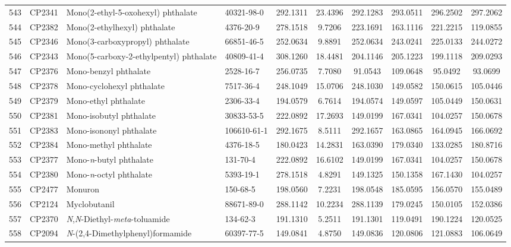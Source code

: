 \begin{longtable}{clllcccccc}
543 & CP2341 & Mono(2-ethyl-5-oxohexyl) phthalate & 40321-98-0 & 292.1311 & 23.4396 & 292.1283 & 293.0511 & 296.2502 & 297.2062 \\ 
544 & CP2382 & Mono(2-ethylhexyl) phthalate\smash{\textsuperscript{\textdaggerdbl}} & 4376-20-9 & 278.1518 & 9.7206 & 223.1691 & 163.1116 & 221.2215 & 119.0855 \\ 
545 & CP2346 & Mono(3-carboxypropyl) phthalate & 66851-46-5 & 252.0634 & 9.8891 & 252.0634 & 243.0241 & 225.0133 & 244.0272 \\ 
546 & CP2343 & Mono(5-carboxy-2-ethylpentyl) phthalate & 40809-41-4 & 308.1260 & 18.4481 & 204.1146 & 205.1223 & 199.1118 & 209.0293 \\ 
547 & CP2376 & Mono-benzyl phthalate & 2528-16-7 & 256.0735 & 7.7080 & 91.0543 & 109.0648 & 95.0492 & 93.0699 \\ 
548 & CP2378 & Mono-cyclohexyl phthalate & 7517-36-4 & 248.1049 & 15.0706 & 248.1030 & 149.0582 & 150.0615 & 105.0446 \\ 
549 & CP2379 & Mono-ethyl phthalate & 2306-33-4 & 194.0579 & 6.7614 & 194.0574 & 149.0597 & 105.0449 & 150.0631 \\ 
550 & CP2381 & Mono-isobutyl phthalate & 30833-53-5 & 222.0892 & 17.2693 & 149.0199 & 167.0341 & 104.0257 & 150.0678 \\ 
551 & CP2383 & Mono-isononyl phthalate & 106610-61-1 & 292.1675 & 8.5111 & 292.1657 & 163.0865 & 164.0945 & 166.0692 \\ 
552 & CP2384 & Mono-methyl phthalate & 4376-18-5 & 180.0423 & 14.2831 & 163.0390 & 179.0340 & 133.0285 & 180.8716 \\ 
553 & CP2377 & Mono-\textit{n}-butyl phthalate & 131-70-4 & 222.0892 & 16.6102 & 149.0199 & 167.0341 & 104.0257 & 150.0678 \\ 
554 & CP2380 & Mono-\textit{n}-octyl phthalate & 5393-19-1 & 278.1518 & 4.8291 & 149.1325 & 150.1358 & 167.1430 & 104.0257 \\ 
555 & CP2477 & Monuron & 150-68-5 & 198.0560 & 7.2231 & 198.0548 & 185.0595 & 156.0570 & 155.0489 \\ 
556 & CP2124 & Myclobutanil & 88671-89-0 & 288.1142 & 10.2234 & 288.1139 & 179.0245 & 150.0105 & 152.0386 \\ 
557 & CP2370 & \textit{N},\textit{N}-Diethyl-\textit{meta}-toluamide & 134-62-3 & 191.1310 & 5.2511 & 191.1301 & 119.0491 & 190.1224 & 120.0525 \\ 
558 & CP2094 & \textit{N}-(2,4-Dimethylphenyl)formamide & 60397-77-5 & 149.0841 & 4.8750 & 149.0836 & 120.0806 & 121.0883 & 106.0649 \\ 

\end{longtable}
